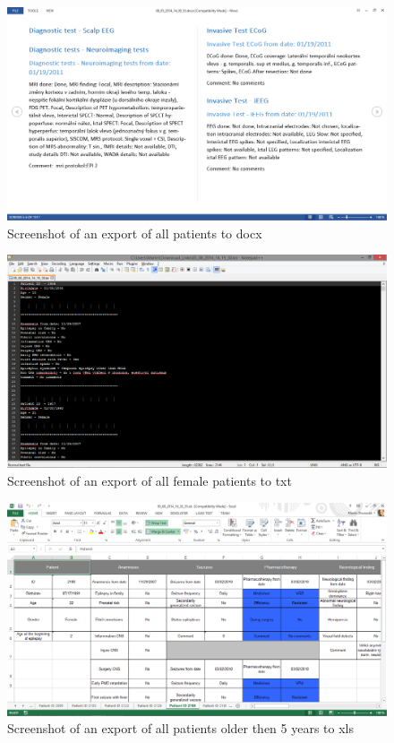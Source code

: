\documentclass[thesis=B,english]{FITthesis}[2012/10/20]
\begin{document}
\begin{figure}[ht]\centering
\includegraphics[width=0.6\paperwidth]{docxExport_2}
		\caption{Screenshot of an export of all patients to docx}
\end{figure}


\begin{figure}[ht]\centering
\includegraphics[width=0.6\paperwidth]{txtExport}
		\caption{Screenshot of an export of all female patients to txt}
\end{figure}


\begin{figure}[ht]\centering
\includegraphics[width=0.6\paperwidth]{xlsExport_1}
		\caption{Screenshot of an export of all patients older then 5 years to xls}
\end{figure}
\end{document}

